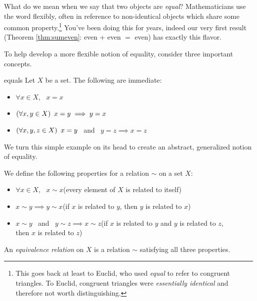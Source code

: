 What do we mean when we say that two objects are \emph{equal}? Mathematicians use the word flexibly, often in reference to non-identical objects which share some common property.\footnote{This goes back at least to Euclid, who used \emph{equal} to refer to congruent triangles. To Euclid, congruent triangles were \emph{essentially identical} and therefore not worth distinguishing.} You've been doing this for years, indeed our very first result (Theorem \ref{thm:sumeven}: even + even $=$ even) has exactly this flavor.\smallbreak

To help develop a more flexible notion of equality, consider three important concepts.

\begin{example}{}{equals}
	Let $X$ be a set. The following are immediate:
	\begin{itemize}\itemsep1pt
	  \item[] $\forall x\in X$, \ $x=x$
		\item[]\eqsymm $(\forall x,y\in X)\lstsp x=y\implies y=x$
		\item[]\eqtrans $(\forall x,y,z\in X)\lstsp x=y$ \ and \ $y=z\implies x=z$
	\end{itemize}
\end{example}

We turn this simple example on its head to create an abstract, generalized notion of equality.

\begin{defn}{}{}
	We define the following properties for a relation\footnotemark{} $\sim$ on a set $X$:
	\begin{itemize}\itemsep1pt
	  \item[] $\forall x\in X$, \ $x\sim x$\hfill(every element of $X$ is related to itself)
		\item[]\eqsymm $x\sim y\implies y\sim x$\hfill(if $x$ is related to $y$, then $y$ is related to $x$)
		\item[]\eqtrans $x\sim y$ \ and \ $y\sim z\implies x\sim z$\hfill(if $x$ is related to $y$ and $y$ is related to $z$,\\
		\phantom{bob}\hfill then $x$ is related to $z$)
	\end{itemize}
	An \emph{equivalence relation} on $X$ is a relation $\sim$ satisfying all three properties.
\end{defn}


